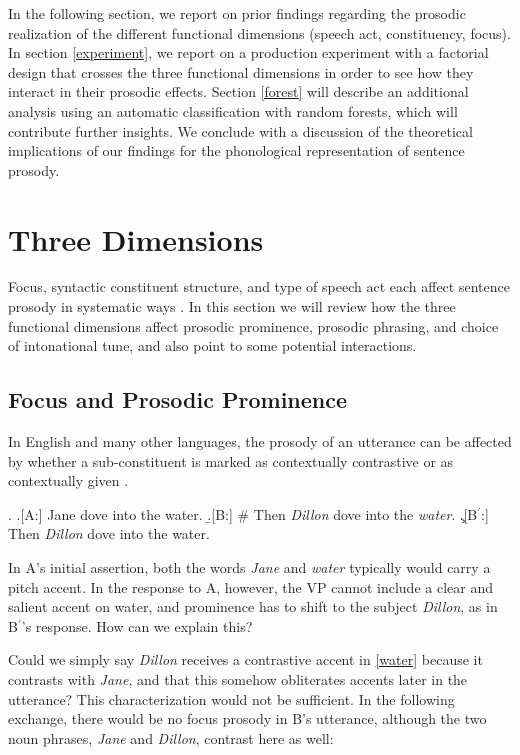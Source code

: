 \documentclass[preprint,review,12pt,authoryear,times]{elsarticle}
\begin{document}
In the following section, we report on prior findings regarding the prosodic realization of the different functional dimensions (speech act, constituency, focus). In section \ref{experiment}, we report on a production experiment with a factorial design that crosses the three functional dimensions  in order to see how they interact in their prosodic effects. Section \ref{forest} will describe an additional analysis using an automatic classification with random forests, which will contribute further insights. We conclude with a discussion of the theoretical implications of our findings for the phonological representation of sentence prosody.


\section{Three Dimensions}
\label{reviewsection}

Focus, syntactic constituent structure, and type of speech act each affect sentence prosody in systematic ways \citep[][]{ladd08}. In this section we will review how the three functional dimensions affect prosodic prominence, prosodic phrasing, and choice of intonational tune, and also point to some potential interactions.


\subsection{Focus and Prosodic Prominence}

In English and many other languages, the prosody of an utterance can be affected by whether a sub-constituent is marked as contextually contrastive or as contextually given \citep[see][for a review of these notions]{krifk08}. 

\ex.\label{water}  
\a.[A:] Jane dove into the water. 
\b.[B:] \# Then {\em Dillon} dove into the {\em water}.
\c.[B$^\prime$:] Then {\em Dillon} dove into the water.

In A's initial assertion, both the words {\em Jane} and {\em water} typically would carry a pitch accent. In the response to A, however, the VP cannot include a clear and salient accent on water, and prominence has to shift to the subject {\em Dillon}, as in B$^\prime$'s response. How can we explain this? 

Could we simply say  {\em Dillon} receives a contrastive accent in \ref{water} because it contrasts with {\em Jane}, and that this somehow obliterates accents later in the utterance? This characterization would not be sufficient. In the following exchange, there would be no focus prosody in B's utterance, although the two noun phrases, {\em Jane} and {\em Dillon},  contrast here as well: 
\end{document}
